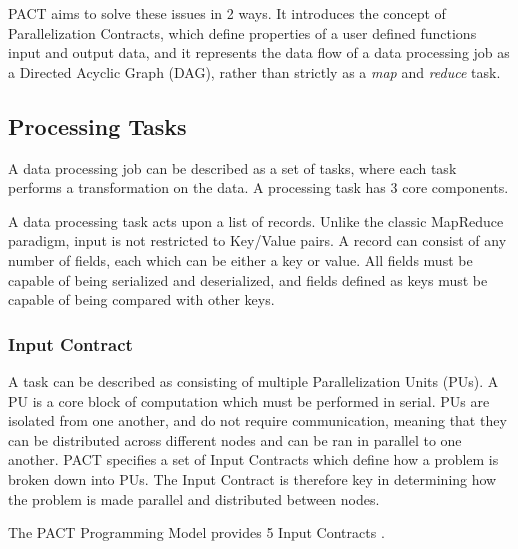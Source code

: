 PACT aims to solve these issues in 2 ways. It introduces the concept of Parallelization Contracts, which define properties of a user defined functions input and output data, and it represents the data flow of a data processing job as a Directed Acyclic Graph (DAG), rather than strictly as a \textit{map} and \textit{reduce} task.

\subsection{Processing Tasks}
A data processing job can be described as a set of tasks, where each task performs a transformation on the data. A processing task has 3 core components.

A data processing task acts upon a list of records. Unlike the classic MapReduce paradigm, input is not restricted to Key/Value pairs. A record can consist of any number of fields, each which can be either a key or value. All fields must be capable of being serialized and deserialized, and fields defined as keys must be capable of being compared with other keys. 

\subsubsection{Input Contract} 
A task can be described as consisting of multiple Parallelization Units (PUs). A PU is a core block of computation which must be performed in serial. PUs are isolated from one another, and do not require communication, meaning that they can be distributed across different nodes and can be ran in parallel to one another. PACT specifies a set of Input Contracts which define how a problem is broken down into PUs. The Input Contract is therefore key in determining how the problem is made parallel and distributed between nodes.

The PACT Programming Model provides 5 Input Contracts \cite{alexandrov2010massively}.

